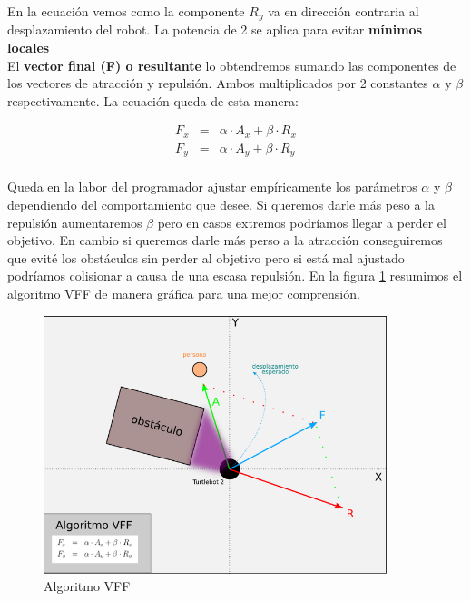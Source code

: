 En la ecuación vemos como la componente $R_y$ va en dirección contraria al desplazamiento del robot. La potencia de 2 se aplica para evitar \textbf{mínimos locales}\\

El \textbf{vector final (F) o resultante} lo obtendremos sumando las componentes de los vectores de atracción y repulsión. Ambos multiplicados por 2 constantes $\alpha$ y $\beta$ respectivamente. La ecuación queda de esta manera:

\begin{eqnarray*}
F_x &=& \alpha \cdot A_x + \beta \cdot R_x\\
F_y &=& \alpha \cdot A_y + \beta \cdot R_y\\
\end{eqnarray*}

Queda en la labor del programador ajustar empíricamente los parámetros $\alpha$ y $\beta$ dependiendo del comportamiento que desee. Si queremos darle más peso a la repulsión aumentaremos $\beta$ pero en casos extremos podríamos llegar a perder el objetivo. En cambio si queremos darle más perso a la atracción conseguiremos que evité los obstáculos sin perder al objetivo pero si está mal ajustado podríamos colisionar a causa de una escasa repulsión. En la figura \ref{fig:esquema_vff} resumimos el algoritmo VFF de manera gráfica para una mejor comprensión.\\

\begin{figure} [H]
  \begin{center}
    \includegraphics[width=10cm]{imagenes/esquema-vff.png}
  \end{center}
  \caption[Algoritmo VFF]{Algoritmo VFF}
  \label{fig:esquema_vff}
\end{figure}\

